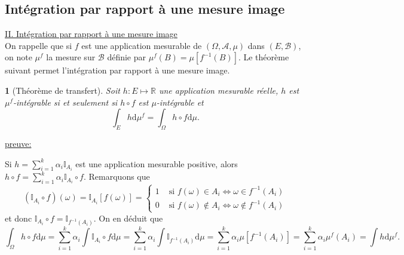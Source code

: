 \documentclass[8pt,notheorems]{beamer}
\def \R{\mathbb{R}}
\def \Om{\Omega}
\newtheorem{theorem}{\translate{Theorem}}[section]
\newtheorem{theorem}{\translate{Theoreme}}
\theoremstyle{definition}
\theoremstyle{example}
\theoremstyle{mystyle}
\theoremstyle{plain}
\begin{document}
\begin{frame}[allowframebreaks]
\section{Intégration par rapport à une mesure image}
\underline{II. Intégration par rapport à une mesure image}\\
On rappelle que si $f$ est une application mesurable de $(\Om,\mathcal{A},\mu)$ dans $(E,\mathcal{B})$, on note $\mu^{f}$ la mesure sur $\mathcal{B}$ définie par $\mu^{f}(B)=\mu[f^{-1}(B)]$. Le théorème suivant permet l'intégration par rapport à une mesure image.
\begin{theorem}[Théorème de transfert]
Soit $h:E\mapsto\R $ une application mesurable réelle, $h$ est $\mu^f$-intégrable si et seulement si $h\circ f$ est $\mu$-intégrable et 
$$
\int_E h\text{d}\mu^{f}=\int_\Om h\circ f\text{d}\mu.
$$
\end{theorem}
\underline{preuve:}\\


Si $h = \sum_{i=1}^{k}\alpha_i\mathbb{I}_{A_i}$ est une application mesurable positive, alors $h\circ f = \sum_{i=1}^{k}\alpha_i\mathbb{I}_{A_i}\circ f$. Remarquons que 
$$
(\mathbb{I}_{A_i}\circ f)(\omega) =\mathbb{I}_{A_i}\left[f(\omega)\right] = \begin{cases}
1&\text{ si }f(\omega)\in A_i \Leftrightarrow \omega\in f^{-1}(A_i)\\
0&   \text{ si }f(\omega)\notin A_i \Leftrightarrow \omega\notin f^{-1}(A_i)
\end{cases} 
$$
et donc $\mathbb{I}_{A_i}\circ f = \mathbb{I}_{f^{-1}(A_i)}$. On en déduit que 
$$
\int_{\Omega}h\circ f\text{d}\mu = \sum_{i = 1}^k\alpha_i\int \mathbb{I}_{A_i} \circ f\text{d}\mu = \sum_{i = 1}^k\alpha_i\int \mathbb{I}_{f^{-1}(A_i)} \text{d}\mu = \sum_{i = 1}^k\alpha_i\mu\left[f^{-1}(A_i)\right] = \sum_{i = 1}^k\alpha_i\mu^f(A_i)=\int h\text{d}\mu^f . 
$$


\end{frame}
\end{document}
